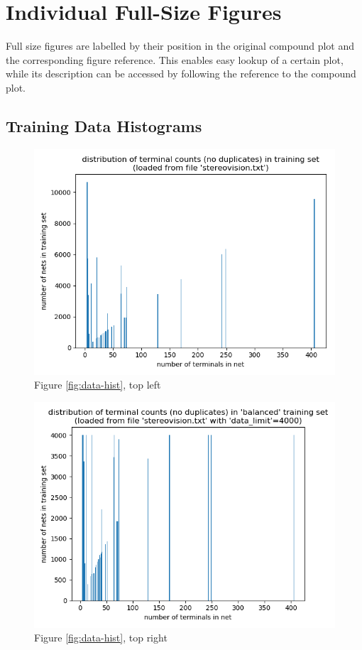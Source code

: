 \pagebreak
\section{Individual Full-Size Figures}

Full size figures are labelled by their position in the original compound plot and the corresponding figure reference. This enables easy lookup of a certain plot, while its description can be accessed by following the reference to the compound plot.

\subsection{Training Data Histograms}

\begin{figure}[H]
	\includegraphics[width=\linewidth]{plots/data-distribution-full-fine.png}
	\caption{Figure \ref{fig:data-hist}, top left}
\end{figure}

\begin{figure}[H]
	\includegraphics[width=\linewidth]{plots/data-distribution-limited-fine.png}
	\caption{Figure \ref{fig:data-hist}, top right}
\end{figure}

